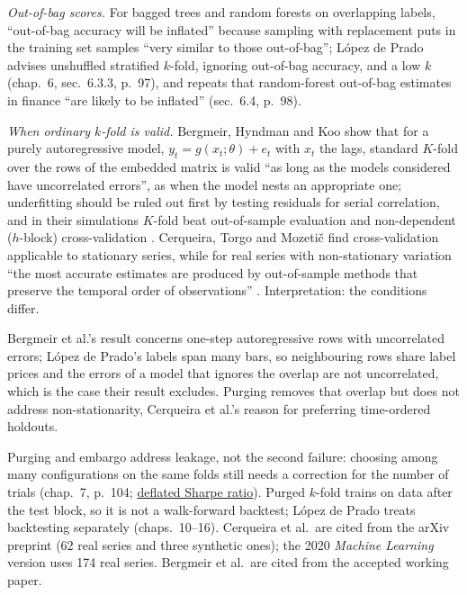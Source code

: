 \begin{qfmethod}
 \emph{Out-of-bag scores.} For bagged trees and random forests on overlapping labels, ``out-of-bag accuracy will be inflated'' because sampling with replacement puts in the training set samples ``very similar to those out-of-bag''; López de Prado advises unshuffled stratified $k$-fold, ignoring out-of-bag accuracy, and a low $k$ (chap.~6, sec.~6.3.3, p.~97), and repeats that random-forest out-of-bag estimates in finance ``are likely to be inflated'' (sec.~6.4, p.~98).

\emph{When ordinary $k$-fold is valid.} Bergmeir, Hyndman and Koo show that for a purely autoregressive model, $y_t=g(x_t;\theta)+e_t$ with $x_t$ the lags, standard $K$-fold over the rows of the embedded matrix is valid ``as long as the models considered have uncorrelated errors'', as when the model nests an appropriate one; underfitting should be ruled out first by testing residuals for serial correlation, and in their simulations $K$-fold beat out-of-sample evaluation and non-dependent ($h$-block) cross-validation \citep[working paper of 23 July 2017, abstract and secs.~1--2, pp.~1--3; sec.~7, p.~14]{rf-bergmeir-hyndman-koo-2018}. Cerqueira, Torgo and Mozetič find cross-validation applicable to stationary series, while for real series with non-stationary variation ``the most accurate estimates are produced by out-of-sample methods that preserve the temporal order of observations'' \citep[arXiv v1, 28 May 2019, abstract, p.~1]{rf-cerqueira-torgo-mozetic-2020}. Interpretation: the conditions differ.

Bergmeir et al.'s result concerns one-step autoregressive rows with uncorrelated errors; López de Prado's labels span many bars, so neighbouring rows share label prices and the errors of a model that ignores the overlap are not uncorrelated, which is the case their result excludes. Purging removes that overlap but does not address non-stationarity, Cerqueira et al.'s reason for preferring time-ordered holdouts.

 Purging and embargo address leakage, not the second failure: choosing among many configurations on the same folds still needs a correction for the number of trials (chap.~7, p.~104; \hyperref[meth:deflated-sharpe-ratio]{deflated Sharpe ratio}). Purged $k$-fold trains on data after the test block, so it is not a walk-forward backtest; López de Prado treats backtesting separately (chaps.~10--16). Cerqueira et al.\ are cited from the arXiv preprint (62 real series and three synthetic ones); the 2020 \emph{Machine Learning} version uses 174 real series. Bergmeir et al.\ are cited from the accepted working paper.


\end{qfmethod}

